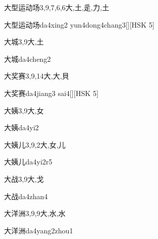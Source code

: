 \begin{Entry}{大型运动场}{3,9,7,6,6}{⼤,⼟,⾡,⼒,⼟}
  \begin{Phonetics}{大型运动场}{da4xing2 yun4dong4chang3}[][HSK 5]
  \end{Phonetics}
\end{Entry}

\begin{Entry}{大城}{3,9}{⼤,⼟}
  \begin{Phonetics}{大城}{da4cheng2}
  \end{Phonetics}
\end{Entry}

\begin{Entry}{大奖赛}{3,9,14}{⼤,⼤,⾙}
  \begin{Phonetics}{大奖赛}{da4jiang3 sai4}[][HSK 5]
  \end{Phonetics}
\end{Entry}

\begin{Entry}{大姨}{3,9}{⼤,⼥}
  \begin{Phonetics}{大姨}{da4yi2}
  \end{Phonetics}
\end{Entry}

\begin{Entry}{大姨儿}{3,9,2}{⼤,⼥,⼉}
  \begin{Phonetics}{大姨儿}{da4yi2r5}
  \end{Phonetics}
\end{Entry}

\begin{Entry}{大战}{3,9}{⼤,⼽}
  \begin{Phonetics}{大战}{da4zhan4}
  \end{Phonetics}
\end{Entry}

\begin{Entry}{大洋洲}{3,9,9}{⼤,⽔,⽔}
  \begin{Phonetics}{大洋洲}{da4yang2zhou1}
  \end{Phonetics}
\end{Entry}


